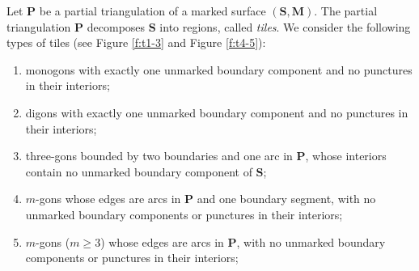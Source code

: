 \documentclass[a4paper,10pt]{amsart}
\theoremstyle{plain}          %
\theoremstyle{definition}
\def\SS{\mathbf{S}}
\def\Pf{\mathbf{P}}
\def\MM{\mathbf{M}}
\def\MM{\mathbf{M}}
\begin{document}
Let $\Pf$ be a partial triangulation of a marked surface $(\SS,\MM)$. The partial triangulation $\Pf$ decomposes $\SS$ into regions, called \emph{tiles}. We consider the following types of tiles (see Figure \ref{f:t1-3} and Figure \ref{f:t4-5}):
\begin{enumerate}
	\item[(I)] monogons with exactly one unmarked boundary component and no punctures in their interiors;
	\item[(II)] digons with exactly one unmarked boundary component and no punctures in their interiors;
    \item [(III)]three-gons bounded by two boundaries and one arc in $\Pf$, whose interiors contain no unmarked boundary component of $\SS$;
    \item [(IV)] $m$-gons whose edges are arcs in $\Pf$ and one boundary segment, with no unmarked boundary components or punctures in their interiors; 
      \item[(V)] $m$-gons ($m\geq 3$) whose edges are arcs in $\Pf$, with no unmarked boundary components or punctures in their interiors;
\end{enumerate}
\end{document}

